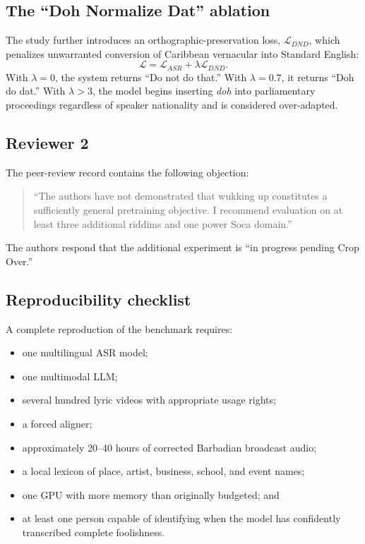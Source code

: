 \documentclass[10pt,twocolumn]{article}
\begin{document}
\subsection{The ``Doh Normalize Dat'' ablation}
The study further introduces an orthographic-preservation loss, $\mathcal{L}_{DND}$, which penalizes unwarranted conversion of Caribbean vernacular into Standard English:
\begin{equation}
\mathcal{L} = \mathcal{L}_{ASR} + \lambda\mathcal{L}_{DND}.
\end{equation}
With $\lambda=0$, the system returns ``Do not do that.'' With $\lambda=0.7$, it returns ``Doh do dat.'' With $\lambda>3$, the model begins inserting \emph{doh} into parliamentary proceedings regardless of speaker nationality and is considered over-adapted.

\subsection{Reviewer 2}
The peer-review record contains the following objection:

\begin{quote}\small
``The authors have not demonstrated that wukking up constitutes a sufficiently general pretraining objective. I recommend evaluation on at least three additional riddims and one power Soca domain.''
\end{quote}

The authors respond that the additional experiment is ``in progress pending Crop Over.''

\subsection{Reproducibility checklist}
A complete reproduction of the benchmark requires:
\begin{itemize}
\item one multilingual ASR model;
\item one multimodal LLM;
\item several hundred lyric videos with appropriate usage rights;
\item a forced aligner;
\item approximately 20--40 hours of corrected Barbadian broadcast audio;
\item a local lexicon of place, artist, business, school, and event names;
\item one GPU with more memory than originally budgeted; and
\item at least one person capable of identifying when the model has confidently transcribed complete foolishness.
\end{itemize}
\end{document}
